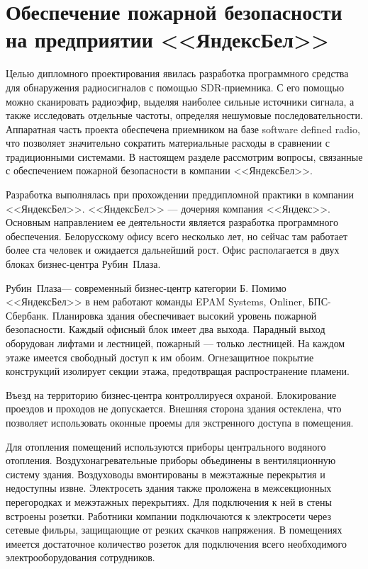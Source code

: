 \newcommand{\yandex}{\mbox{<<Яндекс>>}}
\newcommand{\yandexbel}{\mbox{<<ЯндексБел>>}}
\newcommand{\rubinplaza}{\mbox{Рубин Плаза}}

\section[Обеспечение пожарной безопасности на предприятии]{Обеспечение пожарной безопасности на предприятии \yandexbel{}}

Целью дипломного проектирования явилась разработка программного средства для обнаружения радиосигналов с помощью SDR-приемника. С его помощью можно сканировать радиоэфир, выделяя наиболее сильные источники сигнала, а также исследовать отдельные частоты, определяя нешумовые последовательности. Аппаратная часть проекта обеспечена приемником на базе software defined radio, что позволяет значительно сократить материальные расходы в сравнении с традиционными системами. В настоящем разделе рассмотрим вопросы, связанные с обеспечением пожарной безопасности в компании \yandexbel{}.

Разработка выполнялась при прохождении преддипломной практики в компании \yandexbel{}. \yandexbel{} --- дочерняя компания \yandex{}. Основным направлением ее деятельности является разработка программного обеспечения. Белорусскому офису всего несколько лет, но сейчас там работает более ста человек и ожидается дальнейший рост. Офис располагается в двух блоках бизнес-центра \rubinplaza{}.

\rubinplaza --- современный бизнес-центр категории Б. Помимо \yandexbel{} в нем работают команды EPAM Systems, Onliner, БПС-Сбербанк. Планировка здания обеспечивает высокий уровень пожарной безопасности. Каждый офисный блок имеет два выхода. Парадный выход оборудован лифтами и лестницей, пожарный --- только лестницей. На каждом этаже имеется свободный доступ к им обоим. Огнезащитное покрытие конструкций изолирует секции этажа, предотвращая распространение пламени.

Въезд на территорию бизнес-центра контроллируеся охраной. Блокирование проездов и проходов не допускается. Внешняя сторона здания остеклена, что позволяет использовать оконные проемы для экстренного доступа в помещения.

Для отопления помещений используются приборы центрального водяного отопления. Воздухонагревательные приборы объединены в вентиляционную систему здания. Воздуховоды вмонтированы в межэтажные перекрытия и недоступны извне. Электросеть здания также проложена в межсекционных перегородках и межэтажных перекрытиях. Для подключения к ней в стены встроены розетки. Работники компании подключаются к электросети через сетевые фильры, защищающие от резких скачков напряжения. В помещениях имеется достаточное количество розеток для подключения всего необходимого электрооборудования сотрудников.

